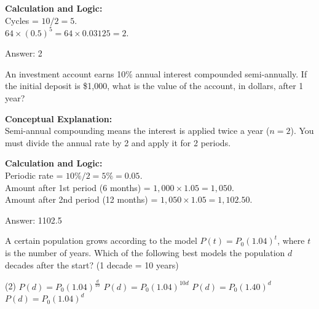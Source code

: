\documentclass[11pt,paper=a4,answers]{exam}
\begin{document}
\begin{questions}
\begin{solution}
\textbf{Calculation and Logic:} \\
Cycles = $10 / 2 = 5$. \\
$64 \times (0.5)^5 = 64 \times 0.03125 = 2$.

\vspace{25pt}

Answer: \colorbox{yellow!100}{2}
\end{solution}


\question
An investment account earns 10\% annual interest compounded semi-annually. If the initial deposit is \$1,000, what is the value of the account, in dollars, after 1 year?

\begin{solution}
\textbf{Conceptual Explanation:} \\
Semi-annual compounding means the interest is applied twice a year ($n=2$). You must divide the annual rate by 2 and apply it for 2 periods.

\vspace{20pt}

\textbf{Calculation and Logic:} \\
Periodic rate = $10\% / 2 = 5\% = 0.05$. \\
Amount after 1st period (6 months) = $1,000 \times 1.05 = 1,050$. \\
Amount after 2nd period (12 months) = $1,050 \times 1.05 = 1,102.50$.

\vspace{25pt}

Answer: \colorbox{yellow!100}{1102.5}
\end{solution}

\vspace{40pt}

\question
A certain population grows according to the model $P(t) = P_0 (1.04)^t$, where $t$ is the number of years. Which of the following best models the population $d$ decades after the start? (1 decade = 10 years)
\begin{tasks}(2)
    \task $P(d) = P_0 (1.04)^{\frac{d}{10}}$
    \task $P(d) = P_0 (1.04)^{10d}$
    \task $P(d) = P_0 (1.40)^d$
    \task $P(d) = P_0 (1.04)^{d}$
\end{tasks}


\end{questions}
\end{document}
